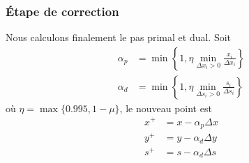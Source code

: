 \documentclass[usepdftitle=false, aspectratio=169]{beamer}
\begin{document}
\begin{frame}
\frametitle{Étape de correction}

Nous calculons finalement le pas primal et dual. Soit
\begin{align*}
\alpha_p &= \min \left\{1, \eta \min_{\Delta x_i>0} \frac{x_i}{\Delta x_i} \right\} \\
\alpha_d &= \min \left\{1, \eta \min_{\Delta s_i>0} \frac{s_i}{\Delta s_i} \right\}
\end{align*}
où $\eta = \max\{0.995, 1 - \mu\}$, le nouveau point est
\begin{align*}
x^+ &= x - \alpha_p \Delta x \\
y^+ &= y - \alpha_d \Delta y \\
s^+ &= s - \alpha_d \Delta s
\end{align*}

\end{frame}
\end{document}
